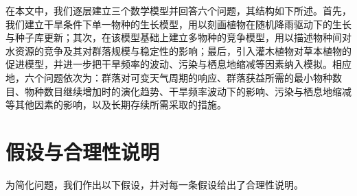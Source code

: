\documentclass[11pt,a4paper]{ctexart}
\begin{document}
在本文中，我们逐层建立三个数学模型并回答六个问题，其结构如下所述。首先，我们建立干旱条件下单一物种的生长模型，用以刻画植物在随机降雨驱动下的生长与种子库更新；其次，在该模型基础上建立多物种的竞争模型，用以描述物种间对水资源的竞争及其对群落规模与稳定性的影响；最后，引入灌木植物对草本植物的促进模型，并进一步把干旱频率的波动、污染与栖息地缩减等因素纳入模拟。相应地，六个问题依次为：群落对可变天气周期的响应、群落获益所需的最小物种数目、物种数目继续增加时的演化趋势、干旱频率波动下的影响、污染与栖息地缩减等其他因素的影响，以及长期存续所需采取的措施。

\section{假设与合理性说明}

为简化问题，我们作出以下假设，并对每一条假设给出了合理性说明。
\end{document}
